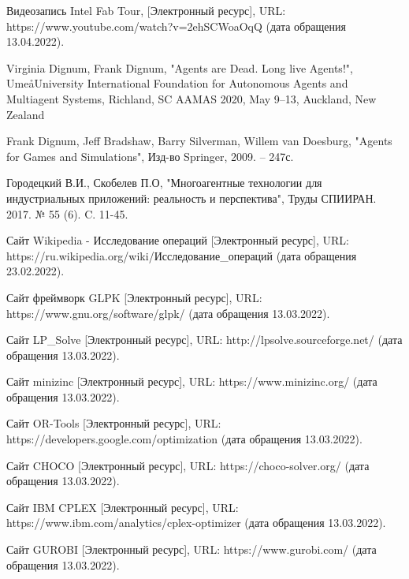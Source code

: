 \begingroup 
\renewcommand{\section}[2]{\anonsection{Список использованных источников}}
\begin{thebibliography}{00}
	Видеозапись Intel Fab Tour,
	[Электронный ресурс],
	URL: https://www.youtube.com/watch?v=2ehSCWoaOqQ
	(дата обращения 13.04.2022).

    Virginia Dignum, Frank Dignum,
    "Agents are Dead. Long live Agents!",
    UmeåUniversity
    International Foundation for Autonomous Agents and Multiagent Systems, Richland, SC
    AAMAS 2020, May 9–13, Auckland, New Zealand
    
	Frank Dignum, Jeff Bradshaw, Barry Silverman, Willem van Doesburg,
    "Agents for Games and Simulations",
    Изд-во Springer, 2009. -- 247с.

	Городецкий В.И., Скобелев П.О,
    "Многоагентные технологии для индустриальных приложений: реальность и перспектива",
    Труды СПИИРАН. 2017. № 55 (6). C. 11-45.
    
	Сайт Wikipedia - Исследование операций
    [Электронный ресурс],
    URL: https://ru.wikipedia.org/wiki/Исследование\_операций
    (дата обращения 23.02.2022).
	

	Сайт фреймворк GLPK
	[Электронный ресурс],
	URL: https://www.gnu.org/software/glpk/
	(дата обращения 13.03.2022).
    
    Сайт LP\_Solve
    [Электронный ресурс],
    URL: http://lpsolve.sourceforge.net/
    (дата обращения 13.03.2022).

    Сайт minizinc
    [Электронный ресурс],
    URL: https://www.minizinc.org/
    (дата обращения 13.03.2022).

    Сайт OR-Tools
    [Электронный ресурс],
    URL: https://developers.google.com/optimization
    (дата обращения 13.03.2022).

    Сайт CHOCO
    [Электронный ресурс],
    URL: https://choco-solver.org/
    (дата обращения 13.03.2022).
	
    Сайт IBM CPLEX
    [Электронный ресурс],
    URL: https://www.ibm.com/analytics/cplex-optimizer
    (дата обращения 13.03.2022).

    Сайт GUROBI
    [Электронный ресурс],
    URL: https://www.gurobi.com/
    (дата обращения 13.03.2022).
   

\end{thebibliography}

